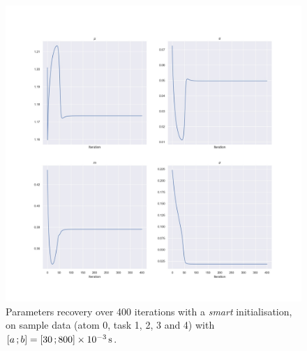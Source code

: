 \begin{figure}[h!]
    \centering
    \includegraphics[width=\textwidth]{pics/results_sample/history_params_atom_0_task_1_2_3_4.jpg}
    \caption{Parameters recovery over 400 iterations with a \textit{smart} initialisation, on sample data (atom 0, task 1, 2, 3 and 4) with $\left[ a \, ; b \right] = \left[ 30 \, ; 800 \right]\times \SI{e-3}{\second}$.}
    \label{fig:history_params_atom_0_task_1_2_3_4}
\end{figure}